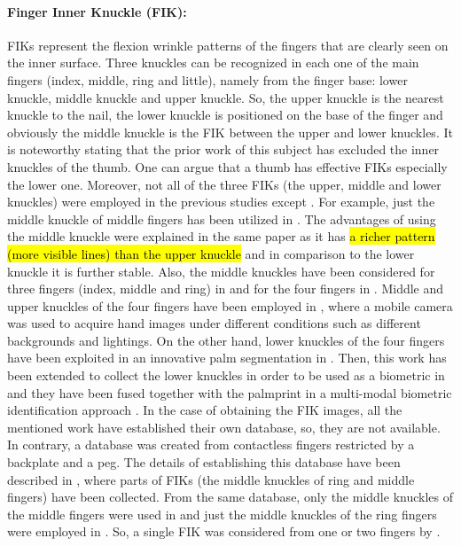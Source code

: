 \documentclass[review]{elsarticle}
\begin{document}
	\paragraph{\textbf{Finger Inner Knuckle (FIK):}} FIKs represent the flexion wrinkle patterns of the fingers that are clearly seen on the inner surface. Three knuckles can be recognized in each one of the main fingers (index, middle, ring and little), namely from the finger base: lower knuckle, middle knuckle and upper knuckle. So, the upper knuckle is the nearest knuckle to the nail, the lower knuckle is positioned on the base of the finger and obviously the middle knuckle is the FIK between the upper and lower knuckles. 
	It is noteworthy stating that the prior work of this subject has excluded the inner knuckles of the thumb. One can argue that a thumb has effective FIKs especially the lower one. Moreover, not all of the three FIKs (the upper, middle and lower knuckles) were employed in the previous studies except \cite{Le-qing2010multimodal}. For example, just the middle knuckle of middle fingers has been utilized in \cite{li2004personal}. The advantages of using the middle knuckle were explained in the same paper as it has \hl{a richer pattern (more visible lines) than the upper knuckle} and in comparison to the lower knuckle it is further stable. Also, the middle knuckles have been considered for three fingers (index, middle and ring) in \cite{anitha2016fusion} and for the four fingers in \cite{xu2015illumination}. Middle and upper knuckles of the four fingers have been employed in \cite{xu2015novel}, where a mobile camera was used to acquire hand images under different conditions such as different backgrounds and lightings. On the other hand, lower knuckles of the four fingers have been exploited in an innovative palm segmentation in \cite{aykut2013aam}. Then, this work has been extended to collect the lower knuckles in order to be used as a biometric in \cite{Makul2014Biyometric} and they have been fused together with the palmprint in a multi-modal biometric identification approach \cite{makul2016palm}. 
	In the case of obtaining the FIK images, all the mentioned work have established their own database, so, they are not available. In contrary, a database was created from contactless fingers restricted by a backplate and a peg. The details of establishing this database have been described in \cite{liu2014ANew}, where parts of FIKs (the middle knuckles of ring and middle fingers) have been collected. From the same database, only the middle knuckles of the middle fingers were used in \cite{liu2013InnerKnuckle} and just the middle knuckles of the ring fingers were employed in \cite{liu2013Inner}. So, a single FIK was considered from one or two fingers by \cite{liu2013InnerKnuckle,liu2013Inner,liu2014ANew}. 
\end{document}
